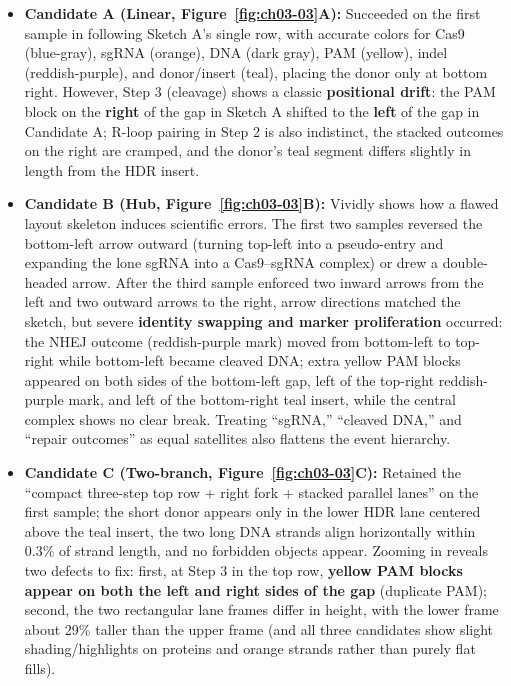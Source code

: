 \begin{itemize}
\item \textbf{Candidate A (Linear, Figure~\ref{fig:ch03-03}A):} Succeeded on the first sample in following Sketch A's single row, with accurate colors for Cas9 (blue-gray), sgRNA (orange), DNA (dark gray), PAM (yellow), indel (reddish-purple), and donor/insert (teal), placing the donor only at bottom right. However, Step 3 (cleavage) shows a classic \textbf{positional drift}: the PAM block on the \textbf{right} of the gap in Sketch A shifted to the \textbf{left} of the gap in Candidate A; R-loop pairing in Step 2 is also indistinct, the stacked outcomes on the right are cramped, and the donor's teal segment differs slightly in length from the HDR insert.
\item \textbf{Candidate B (Hub, Figure~\ref{fig:ch03-03}B):} Vividly shows how a flawed layout skeleton induces scientific errors. The first two samples reversed the bottom-left arrow outward (turning top-left into a pseudo-entry and expanding the lone sgRNA into a Cas9--sgRNA complex) or drew a double-headed arrow. After the third sample enforced two inward arrows from the left and two outward arrows to the right, arrow directions matched the sketch, but severe \textbf{identity swapping and marker proliferation} occurred: the NHEJ outcome (reddish-purple mark) moved from bottom-left to top-right while bottom-left became cleaved DNA; extra yellow PAM blocks appeared on both sides of the bottom-left gap, left of the top-right reddish-purple mark, and left of the bottom-right teal insert, while the central complex shows no clear break. Treating ``sgRNA,'' ``cleaved DNA,'' and ``repair outcomes'' as equal satellites also flattens the event hierarchy.
\item \textbf{Candidate C (Two-branch, Figure~\ref{fig:ch03-03}C):} Retained the ``compact three-step top row + right fork + stacked parallel lanes'' on the first sample; the short donor appears only in the lower HDR lane centered above the teal insert, the two long DNA strands align horizontally within 0.3\% of strand length, and no forbidden objects appear. Zooming in reveals two defects to fix: first, at Step 3 in the top row, \textbf{yellow PAM blocks appear on both the left and right sides of the gap} (duplicate PAM); second, the two rectangular lane frames differ in height, with the lower frame about 29\% taller than the upper frame (and all three candidates show slight shading/highlights on proteins and orange strands rather than purely flat fills).
\end{itemize}

